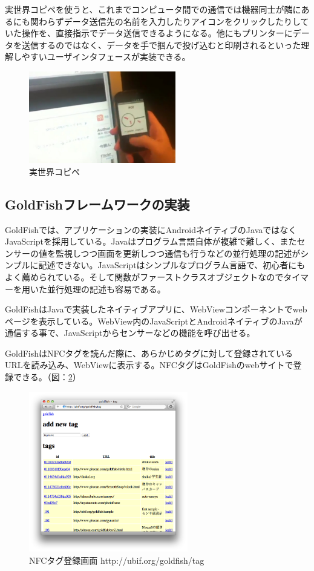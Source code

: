 実世界コピペを使うと、これまでコンピュータ間での通信では機器同士が隣にあるにも関わらずデータ送信先の名前を入力したりアイコンをクリックしたりしていた操作を、直接指示でデータ送信できるようになる。他にもプリンターにデータを送信するのではなく、データを手で掴んで投げ込むと印刷されるといった理解しやすいユーザインタフェースが実装できる。

\begin{figure}
  \begin{center}
    \includegraphics[height=40mm]{img/copy-paste.jpg}
  \end{center}
  \caption{実世界コピペ}
  \label{fig:copy-paste}
\end{figure}


\subsection{GoldFishフレームワークの実装}
GoldFishでは、アプリケーションの実装にAndroidネイティブのJavaではなくJavaScriptを採用している。Javaはプログラム言語自体が複雑で難しく、またセンサーの値を監視しつつ画面を更新しつつ通信も行うなどの並行処理の記述がシンプルに記述できない。JavaScriptはシンプルなプログラム言語で、初心者にもよく薦められている。そして関数がファーストクラスオブジェクトなのでタイマーを用いた並行処理の記述も容易である。

GoldFishはJavaで実装したネイティブアプリに、WebViewコンポーネントでwebページを表示している。WebView内のJavaScriptとAndroidネイティブのJavaが通信する事で、JavaScriptからセンサーなどの機能を呼び出せる。

GoldFishはNFCタグを読んだ際に、あらかじめタグに対して登録されているURLを読み込み、WebViewに表示する。NFCタグはGoldFishのwebサイトで登録できる。（図：\ref{fig:tags}）
\begin{figure}
  \begin{center}
    \includegraphics[height=70mm]{img/tags.png}
  \end{center}
  \caption{NFCタグ登録画面 http://ubif.org/goldfish/tag}
  \label{fig:tags}
\end{figure}

